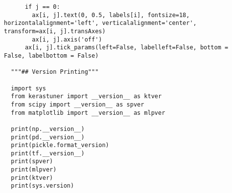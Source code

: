 \documentclass[12pt]{article}
\numberwithin{equation}{section}
\numberwithin{figure}{section}
\numberwithin{table}{section}
\begin{document}
\begin{lstlisting}
      if j == 0:
        ax[i, j].text(0, 0.5, labels[i], fontsize=18, horizontalalignment='left', verticalalignment='center', transform=ax[i, j].transAxes)
        ax[i, j].axis('off')
      ax[i, j].tick_params(left=False, labelleft=False, bottom = False, labelbottom = False)
  
  """## Version Printing"""
  
  import sys
  from kerastuner import __version__ as ktver
  from scipy import __version__ as spver
  from matplotlib import __version__ as mlpver
  
  print(np.__version__)
  print(pd.__version__)
  print(pickle.format_version)
  print(tf.__version__)
  print(spver)
  print(mlpver)
  print(ktver)
  print(sys.version)
\end{lstlisting}
\end{document}
